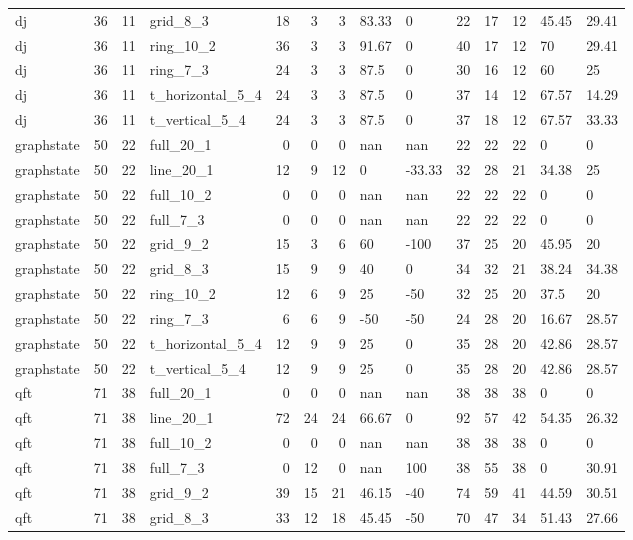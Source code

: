 \begin{longtable}{lrrlrrrllrrrll}
dj & 36 & 11 & grid\_8\_3 & 18 & 3 & 3 & 83.33 & 0 & 22 & 17 & 12 & 45.45 & 29.41 \\
dj & 36 & 11 & ring\_10\_2 & 36 & 3 & 3 & 91.67 & 0 & 40 & 17 & 12 & 70 & 29.41 \\
dj & 36 & 11 & ring\_7\_3 & 24 & 3 & 3 & 87.5 & 0 & 30 & 16 & 12 & 60 & 25 \\
dj & 36 & 11 & t\_horizontal\_5\_4 & 24 & 3 & 3 & 87.5 & 0 & 37 & 14 & 12 & 67.57 & 14.29 \\
dj & 36 & 11 & t\_vertical\_5\_4 & 24 & 3 & 3 & 87.5 & 0 & 37 & 18 & 12 & 67.57 & 33.33 \\
graphstate & 50 & 22 & full\_20\_1 & 0 & 0 & 0 & nan & nan & 22 & 22 & 22 & 0 & 0 \\
graphstate & 50 & 22 & line\_20\_1 & 12 & 9 & 12 & 0 & -33.33 & 32 & 28 & 21 & 34.38 & 25 \\
graphstate & 50 & 22 & full\_10\_2 & 0 & 0 & 0 & nan & nan & 22 & 22 & 22 & 0 & 0 \\
graphstate & 50 & 22 & full\_7\_3 & 0 & 0 & 0 & nan & nan & 22 & 22 & 22 & 0 & 0 \\
graphstate & 50 & 22 & grid\_9\_2 & 15 & 3 & 6 & 60 & -100 & 37 & 25 & 20 & 45.95 & 20 \\
graphstate & 50 & 22 & grid\_8\_3 & 15 & 9 & 9 & 40 & 0 & 34 & 32 & 21 & 38.24 & 34.38 \\
graphstate & 50 & 22 & ring\_10\_2 & 12 & 6 & 9 & 25 & -50 & 32 & 25 & 20 & 37.5 & 20 \\
graphstate & 50 & 22 & ring\_7\_3 & 6 & 6 & 9 & -50 & -50 & 24 & 28 & 20 & 16.67 & 28.57 \\
graphstate & 50 & 22 & t\_horizontal\_5\_4 & 12 & 9 & 9 & 25 & 0 & 35 & 28 & 20 & 42.86 & 28.57 \\
graphstate & 50 & 22 & t\_vertical\_5\_4 & 12 & 9 & 9 & 25 & 0 & 35 & 28 & 20 & 42.86 & 28.57 \\
qft & 71 & 38 & full\_20\_1 & 0 & 0 & 0 & nan & nan & 38 & 38 & 38 & 0 & 0 \\
qft & 71 & 38 & line\_20\_1 & 72 & 24 & 24 & 66.67 & 0 & 92 & 57 & 42 & 54.35 & 26.32 \\
qft & 71 & 38 & full\_10\_2 & 0 & 0 & 0 & nan & nan & 38 & 38 & 38 & 0 & 0 \\
qft & 71 & 38 & full\_7\_3 & 0 & 12 & 0 & nan & 100 & 38 & 55 & 38 & 0 & 30.91 \\
qft & 71 & 38 & grid\_9\_2 & 39 & 15 & 21 & 46.15 & -40 & 74 & 59 & 41 & 44.59 & 30.51 \\
qft & 71 & 38 & grid\_8\_3 & 33 & 12 & 18 & 45.45 & -50 & 70 & 47 & 34 & 51.43 & 27.66 \\

\end{longtable}
